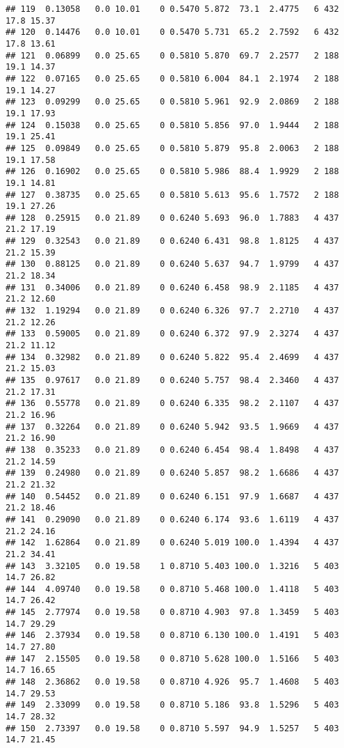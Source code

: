 \documentclass[
]{article}
\begin{document}
\begin{verbatim}
## 119  0.13058   0.0 10.01    0 0.5470 5.872  73.1  2.4775   6 432    17.8 15.37
## 120  0.14476   0.0 10.01    0 0.5470 5.731  65.2  2.7592   6 432    17.8 13.61
## 121  0.06899   0.0 25.65    0 0.5810 5.870  69.7  2.2577   2 188    19.1 14.37
## 122  0.07165   0.0 25.65    0 0.5810 6.004  84.1  2.1974   2 188    19.1 14.27
## 123  0.09299   0.0 25.65    0 0.5810 5.961  92.9  2.0869   2 188    19.1 17.93
## 124  0.15038   0.0 25.65    0 0.5810 5.856  97.0  1.9444   2 188    19.1 25.41
## 125  0.09849   0.0 25.65    0 0.5810 5.879  95.8  2.0063   2 188    19.1 17.58
## 126  0.16902   0.0 25.65    0 0.5810 5.986  88.4  1.9929   2 188    19.1 14.81
## 127  0.38735   0.0 25.65    0 0.5810 5.613  95.6  1.7572   2 188    19.1 27.26
## 128  0.25915   0.0 21.89    0 0.6240 5.693  96.0  1.7883   4 437    21.2 17.19
## 129  0.32543   0.0 21.89    0 0.6240 6.431  98.8  1.8125   4 437    21.2 15.39
## 130  0.88125   0.0 21.89    0 0.6240 5.637  94.7  1.9799   4 437    21.2 18.34
## 131  0.34006   0.0 21.89    0 0.6240 6.458  98.9  2.1185   4 437    21.2 12.60
## 132  1.19294   0.0 21.89    0 0.6240 6.326  97.7  2.2710   4 437    21.2 12.26
## 133  0.59005   0.0 21.89    0 0.6240 6.372  97.9  2.3274   4 437    21.2 11.12
## 134  0.32982   0.0 21.89    0 0.6240 5.822  95.4  2.4699   4 437    21.2 15.03
## 135  0.97617   0.0 21.89    0 0.6240 5.757  98.4  2.3460   4 437    21.2 17.31
## 136  0.55778   0.0 21.89    0 0.6240 6.335  98.2  2.1107   4 437    21.2 16.96
## 137  0.32264   0.0 21.89    0 0.6240 5.942  93.5  1.9669   4 437    21.2 16.90
## 138  0.35233   0.0 21.89    0 0.6240 6.454  98.4  1.8498   4 437    21.2 14.59
## 139  0.24980   0.0 21.89    0 0.6240 5.857  98.2  1.6686   4 437    21.2 21.32
## 140  0.54452   0.0 21.89    0 0.6240 6.151  97.9  1.6687   4 437    21.2 18.46
## 141  0.29090   0.0 21.89    0 0.6240 6.174  93.6  1.6119   4 437    21.2 24.16
## 142  1.62864   0.0 21.89    0 0.6240 5.019 100.0  1.4394   4 437    21.2 34.41
## 143  3.32105   0.0 19.58    1 0.8710 5.403 100.0  1.3216   5 403    14.7 26.82
## 144  4.09740   0.0 19.58    0 0.8710 5.468 100.0  1.4118   5 403    14.7 26.42
## 145  2.77974   0.0 19.58    0 0.8710 4.903  97.8  1.3459   5 403    14.7 29.29
## 146  2.37934   0.0 19.58    0 0.8710 6.130 100.0  1.4191   5 403    14.7 27.80
## 147  2.15505   0.0 19.58    0 0.8710 5.628 100.0  1.5166   5 403    14.7 16.65
## 148  2.36862   0.0 19.58    0 0.8710 4.926  95.7  1.4608   5 403    14.7 29.53
## 149  2.33099   0.0 19.58    0 0.8710 5.186  93.8  1.5296   5 403    14.7 28.32
## 150  2.73397   0.0 19.58    0 0.8710 5.597  94.9  1.5257   5 403    14.7 21.45

\end{verbatim}
\end{document}
